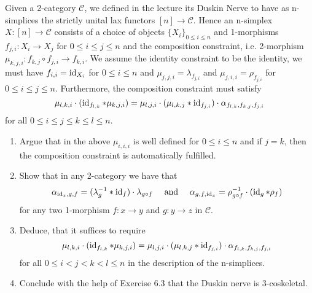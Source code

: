 \begin{Exercise}
	Given a 2-category $ \mathcal{ C } $, we defined in the lecture its Duskin Nerve to have as n-simplices the strictly unital lax functors $ [ n ] \to \mathcal{ C } $.
	Hence an n-simplex $ X \colon [ n ] \to \mathcal{ C } $ consists of a choice of objects $ \{ X_i \}_{ 0 \leq i \leq n } $ and 1-morphisms $ f_{ j , i } \colon  X_i \to X_j $ for $ 0 \leq i \leq j \leq n $ and the composition constraint, i.e. 2-morphism $ \mu_{ k , j , i } \colon f_{ k , j } \circ f_{ j , i } \to f_{ k , i } $.
	We assume the identity constraint to be the identity, we must have $ f_{ i, i }  = \operatorname{id}_{ X_i } $ for $ 0 \leq i \leq n $ and $ \mu_{ j , j , i } = \lambda_{ f_{ j , i } } $ and $ \mu_{ j , i , i } = \rho_{ f_{ j , i } } $ for $ 0 \leq i \leq j \leq n$.
	Furthermore, the composition constraint must satisfy
	\[
	\mu_{ l , k , i } \cdot ( \operatorname{id}_{ f_{ l , k } } * \mu_{ k , j , i } ) = \mu_{ l , j , i } \cdot ( \mu_{ l , k , j } * \operatorname{id}_{ f_{ j , i } } ) \cdot \alpha_{ f_{ l , k } , f_{ k , j } , f_{ j , i } }
	\]
	for all $ 0 \leq i \leq j \leq k \leq l \leq n $.
	
	\begin{enumerate}[label=(\alph*)]
		\item 
		Argue that in the above $ \mu_{ i , i , i } $ is well defined for $ 0 \leq i \leq n $ and if $ j = k $, then the composition constraint is automatically fulfilled.
		
		\item 
		Show that in any 2-category we have that 
		\[
		\alpha_{ \operatorname{id}_z , g , f } = ( \lambda_g^{ - 1 } * \operatorname{id}_f ) \cdot \lambda_{ g \circ f } \quad \text{ and } \quad \alpha_{ g , f , \operatorname{id}_x } = \rho_{ g \circ f }^{ - 1 } \cdot ( \operatorname{id}_g * \rho_f ) 
		\]
		for any two 1-morphism $ f \colon x \to y $ and $ g \colon y \to z $ in $ \mathcal{ C } $.
		
		\item 
		Deduce, that it suffices to require
		\[
		\mu_{ l , k , i } \cdot ( \operatorname{id}_{ f_{ l , k } } * \mu_{ k , j , i } ) 
		=
		\mu_{ l , j , i } \cdot ( \mu_{ l , k , j } * \operatorname{id}_{ f_{ j , i } } ) \cdot 
		\alpha_{ f_{ l , k } , f_{ k , j } , f_{ j , i } } 
		\]
		for all $ 0 \leq i < j < k < l \leq n $ in the description of the n-simplices.
		
		\item 
		Conclude with the help of Exercise 6.3 that the Duskin nerve is 3-coskeletal.
	\end{enumerate}
\end{Exercise}

